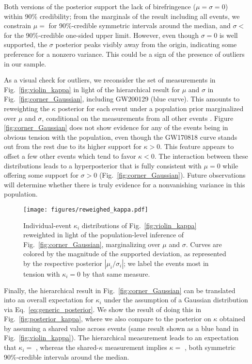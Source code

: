 \documentclass[aps,prd,twocolumn,superscriptaddress,preprintnumbers,floatfix,nofootinbib]{revtex4-2}
\begin{document}
Both versions of the posterior support the lack of birefringence ($\mu = \sigma = 0$) within 90\% credibility; from the marginals of the result including all events, we constrain $\mu =$  for 90\%-credible symmetric intervals around the median, and $\sigma <$  for the 90\%-credible one-sided upper limit.
However, even though $\sigma = 0$ is well supported, the $\sigma$ posterior peaks visibly away from the origin, indicating some preference for a nonzero variance.
This could be a sign of the presence of outliers in our sample.

As a visual check for outliers, we reconsider the set of measurements in Fig.~\ref{fig:violin_kappa} in light of the hierarchical result for $\mu$ and $\sigma$ in Fig.~\ref{fig:corner_Gaussian}, including GW200129 (blue curve).
This amounts to reweighting the $\kappa$ posterior for each event under a population prior marginalized over $\mu$ and $\sigma$, conditional on the measurements from all other events \cite{Callister:T2100301}.
Figure \ref{fig:corner_Gaussian} does not show evidence for any of the events being in obvious tension with the population, even though the GW170818 curve stands out from the rest due to its higher support for $\kappa > 0$.
This feature appears to offset a few other events which tend to favor $\kappa < 0$.
The interaction between these distributions leads to a hyperposterior that is fully consistent with $\mu = 0$ while offering some support for $\sigma > 0$ (Fig.~\ref{fig:corner_Gaussian}).
Future observations will determine whether there is truly evidence for a nonvanishing variance in this population.

\begin{figure}
    \texttt{[image: figures/reweighed\_kappa.pdf]}
    \caption{
        Individual-event $\kappa_i$ distributions of Fig.~\ref{fig:violin_kappa} reweighted in light of the population-level inference of Fig.~\ref{fig:corner_Gaussian}, marginalizing over $\mu$ and $\sigma$.
        Curves are colored by the magnitude of the supported deviation, as represented by the respective posterior $|\mu_i / \sigma_i|$; we label the events most in tension with $\kappa_i = 0$ by that same measure.
    }
    \label{fig:reweighted_kappa}
\end{figure}

Finally, the hierarchical result in Fig.~\ref{fig:corner_Gaussian} can be translated into an overall expectation for $\kappa_i$ under the assumption of a Gaussian distribution via Eq.~\eqref{eq:generic_posterior}.
We show the result of doing this in Fig.~\ref{fig:posterior_kappa}, where we also compare to the posterior on $\kappa$ obtained by assuming a shared value across events (same result shown as a blue band in Fig.~\ref{fig:violin_kappa}).
The hierarchical measurement leads to an expectation that $\kappa_i =$ , whereas the shared-$\kappa$ measurement implies $\kappa =$ , both symmetric 90\%-credible intervals around the median.  
\end{document}
